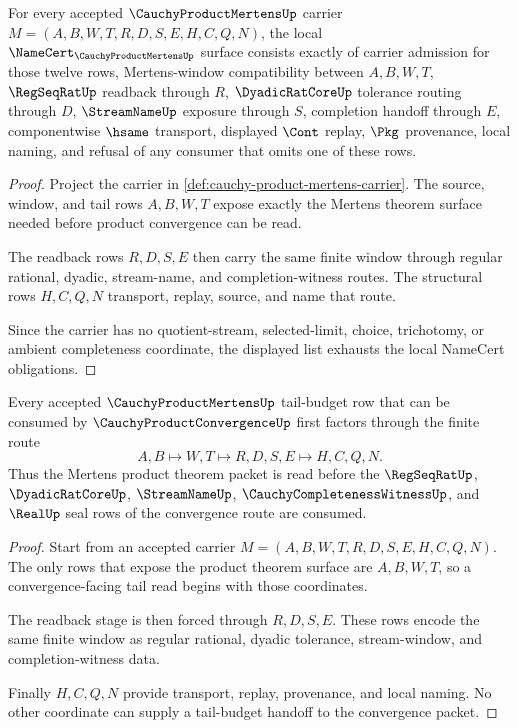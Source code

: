 \begin{theorem}
\label{thm:cauchy-product-mertens-namecert-obligations}
For every accepted $\CauchyProductMertensUp$ carrier $M=(A,B,W,T,R,D,S,E,H,C,Q,N)$, the local $\NameCert_{\CauchyProductMertensUp}$ surface consists exactly of carrier admission for those twelve rows, Mertens-window compatibility between $A,B,W,T$, $\RegSeqRatUp$ readback through $R$, $\DyadicRatCoreUp$ tolerance routing through $D$, $\StreamNameUp$ exposure through $S$, completion handoff through $E$, componentwise $\hsame$ transport, displayed $\Cont$ replay, $\Pkg$ provenance, local naming, and refusal of any consumer that omits one of these rows.
\end{theorem}
\begin{proof}
Project the carrier in \autoref{def:cauchy-product-mertens-carrier}. The source, window, and tail rows $A,B,W,T$ expose exactly the Mertens theorem surface needed before product convergence can be read.

The readback rows $R,D,S,E$ then carry the same finite window through regular rational, dyadic, stream-name, and completion-witness routes. The structural rows $H,C,Q,N$ transport, replay, source, and name that route.

Since the carrier has no quotient-stream, selected-limit, choice, trichotomy, or ambient completeness coordinate, the displayed list exhausts the local NameCert obligations.
\end{proof}

\begin{theorem}
\label{thm:cauchy-product-mertens-tail-budget-handoff}
Every accepted $\CauchyProductMertensUp$ tail-budget row that can be consumed by $\CauchyProductConvergenceUp$ first factors through the finite route
$$
A,B \longmapsto W,T \longmapsto R,D,S,E \longmapsto H,C,Q,N .
$$
Thus the Mertens product theorem packet is read before the $\RegSeqRatUp$, $\DyadicRatCoreUp$, $\StreamNameUp$, $\CauchyCompletenessWitnessUp$, and $\RealUp$ seal rows of the convergence route are consumed.
\end{theorem}
\begin{proof}
Start from an accepted carrier $M=(A,B,W,T,R,D,S,E,H,C,Q,N)$. The only rows that expose the product theorem surface are $A,B,W,T$, so a convergence-facing tail read begins with those coordinates.

The readback stage is then forced through $R,D,S,E$. These rows encode the same finite window as regular rational, dyadic tolerance, stream-window, and completion-witness data.

Finally $H,C,Q,N$ provide transport, replay, provenance, and local naming. No other coordinate can supply a tail-budget handoff to the convergence packet.
\end{proof}

